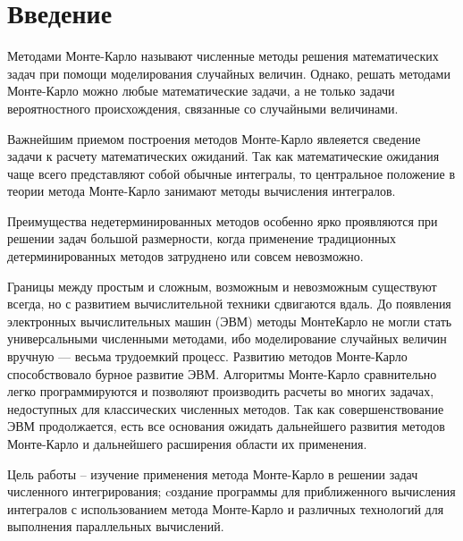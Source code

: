 \documentclass{report}
\begin{document}
\setcounter{page}{2}

\tableofcontents
\newpage

\section*{Введение}
Методами Монте-Карло называют численные методы решения математических задач при помощи моделирования случайных величин. Однако,
решать методами Монте-Карло можно любые математические задачи, а не
только задачи вероятностного происхождения, связанные со случайными
величинами.
\par Важнейшим приемом построения методов Монте-Карло явлеяется сведение задачи к расчету математических ожиданий. Так как математические ожидания чаще всего представляют собой обычные интегралы, то
центральное положение в теории метода Монте-Карло занимают методы
вычисления интегралов.
\par Преимущества недетерминированных методов особенно ярко проявляются при решении задач большой размерности, когда применение традиционных детерминированных методов затруднено или совсем невозможно.
\par Границы между простым и сложным, возможным и невозможным существуют всегда, но с развитием вычислительной техники сдвигаются вдаль. До появления электронных вычислительных машин (ЭВМ) методы МонтеКарло не могли стать универсальными численными методами, ибо моделирование случайных величин вручную — весьма трудоемкий процесс. Развитию методов Монте-Карло способствовало бурное развитие ЭВМ. Алгоритмы Монте-Карло сравнительно легко программируются и позволяют производить расчеты во многих задачах, недоступных для классических численных методов. Так как совершенствование ЭВМ продолжается,
есть все основания ожидать дальнейшего развития методов Монте-Карло
и дальнейшего расширения области их применения.
\par Цель работы – изучение применения метода Монте-Карло в решении задач численного интегрирования; cоздание программы для приближенного вычисления интегралов с использованием метода Монте-Карло и различных технологий для выполнения параллельных вычислений.
\newpage
\end{document}
